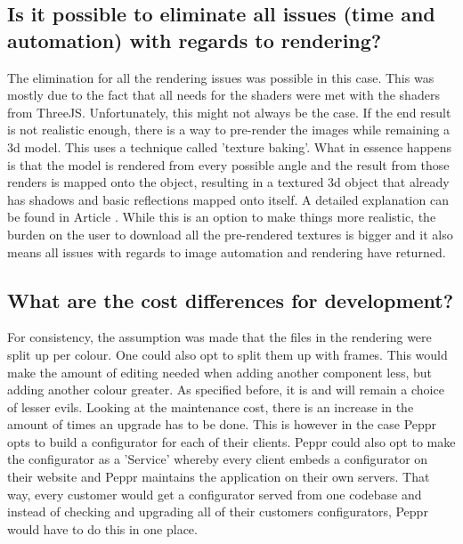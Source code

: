\subsection {Is it possible to eliminate all issues (time and automation) with regards to rendering?}
\label{discuss:developmentElimination}
The elimination for all the rendering issues was possible in this case. This was mostly due to the fact that all needs for the shaders were met with the shaders from ThreeJS. Unfortunately, this might not always be the case. If the end result is not realistic enough, there is a way to pre-render the images while remaining a 3d model. This uses a technique called 'texture baking'. What in essence happens is that the model is rendered from every possible angle and the result from those renders is mapped onto the object, resulting in a textured 3d object that already has shadows and basic reflections mapped onto itself. A detailed explanation can be found in Article \cite{textureBaking}. While this is an option to make things more realistic, the burden on the user to download all the pre-rendered textures is bigger and it also means all issues with regards to image automation and rendering have returned.

\subsection{What are the cost differences for development?}
For consistency, the assumption was made that the files in the rendering were split up per colour. One could also opt to split them up with frames. This would make the amount of editing needed when adding another component less, but adding another colour greater. As specified before, it is and will remain a choice of lesser evils.\newline
Looking at the maintenance cost, there is an increase in the amount of times an upgrade has to be done. This is however in the case Peppr opts to build a configurator for each of their clients. Peppr could also opt to make the configurator as a 'Service' whereby every client embeds a configurator on their website and Peppr maintains the application on their own servers. That way, every customer would get a configurator served from one codebase and instead of checking and upgrading all of their customers configurators, Peppr would have to do this in one place.

